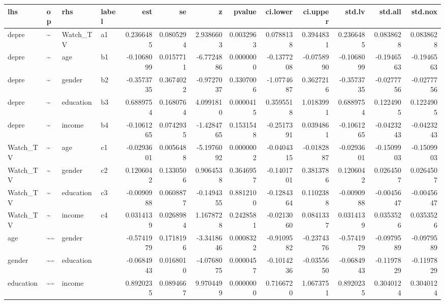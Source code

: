 \documentclass[
]{article}
\begin{document}
\begin{table}[!h]
\centering
\begin{tabular}[t]{llllrrrrrrrrr}
\toprule
lhs & op & rhs & label & est & se & z & pvalue & ci.lower & ci.upper & std.lv & std.all & std.nox\\
\midrule
depre & \textasciitilde{} & Watch\_TV & a1 & 0.2366485 & 0.0805294 & 2.9386603 & 0.0032963 & 0.0788138 & 0.3944831 & 0.2366485 & 0.0838628 & 0.0838628\\
depre & \textasciitilde{} & age & b1 & -0.1068099 & 0.0157711 & -6.7724886 & 0.0000000 & -0.1377208 & -0.0758990 & -0.1068099 & -0.1946563 & -0.1946563\\
depre & \textasciitilde{} & gender & b2 & -0.3573735 & 0.3674022 & -0.9727037 & 0.3307006 & -1.0774687 & 0.3627216 & -0.3573735 & -0.0277756 & -0.0277756\\
depre & \textasciitilde{} & education & b3 & 0.6889754 & 0.1680764 & 4.0991810 & 0.0000415 & 0.3595518 & 1.0183991 & 0.6889754 & 0.1224905 & 0.1224905\\
depre & \textasciitilde{} & income & b4 & -0.1061265 & 0.0742935 & -1.4284765 & 0.1531548 & -0.2517391 & 0.0394861 & -0.1061265 & -0.0423243 & -0.0423243\\
\addlinespace
Watch\_TV & \textasciitilde{} & age & c1 & -0.0293601 & 0.0056488 & -5.1976092 & 0.0000002 & -0.0404315 & -0.0182887 & -0.0293601 & -0.1509903 & -0.1509903\\
Watch\_TV & \textasciitilde{} & gender & c2 & 0.1206042 & 0.1330506 & 0.9064538 & 0.3646957 & -0.1401701 & 0.3813786 & 0.1206042 & 0.0264507 & 0.0264507\\
Watch\_TV & \textasciitilde{} & education & c3 & -0.0090988 & 0.0608877 & -0.1494355 & 0.8812100 & -0.1284364 & 0.1102388 & -0.0090988 & -0.0045647 & -0.0045647\\
Watch\_TV & \textasciitilde{} & income & c4 & 0.0314139 & 0.0268984 & 1.1678728 & 0.2428581 & -0.0213060 & 0.0841337 & 0.0314139 & 0.0353526 & 0.0353526\\
age & \textasciitilde{}\textasciitilde{} & gender &  & -0.5741979 & 0.1718196 & -3.3418646 & 0.0008322 & -0.9109582 & -0.2374376 & -0.5741979 & -0.0979589 & -0.0979589\\
\addlinespace
gender & \textasciitilde{}\textasciitilde{} & education &  & -0.0684943 & 0.0168010 & -4.0768075 & 0.0000457 & -0.1014236 & -0.0355650 & -0.0684943 & -0.1197829 & -0.1197829\\
education & \textasciitilde{}\textasciitilde{} & income &  & 0.8920235 & 0.0894667 & 9.9704499 & 0.0000000 & 0.7166720 & 1.0673751 & 0.8920235 & 0.3040124 & 0.3040124\\

\end{tabular}
\end{table}
\end{document}
